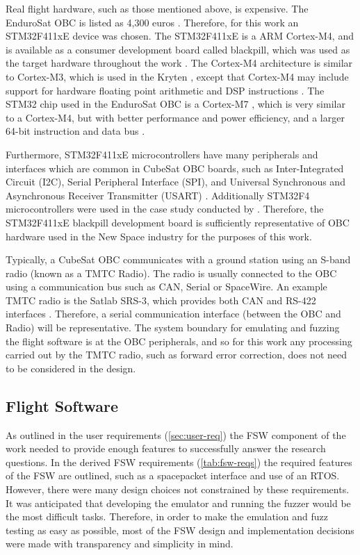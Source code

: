 \documentclass[../report.tex]{subfiles}
\begin{document}
Real flight hardware, such as those mentioned above, is expensive. The
EnduroSat OBC is listed as 4,300 euros \citep{EnduroSat_OBC}. Therefore, for
this work an STM32F411xE device was chosen. The STM32F411xE is a ARM Cortex-M4, and
is available as a consumer development board called blackpill, which was used
as the target hardware throughout the work \citep{blackpill_info}. The
Cortex-M4 architecture is similar to Cortex-M3, which is used in the Kryten
\citep{Clydespace_Kryten}, except that Cortex-M4 may include support for
hardware floating point arithmetic and DSP instructions \citep{Cortex_M3}
\citep{Cortex_M4}. The STM32 chip used in the EnduroSat OBC is a Cortex-M7
\citep{EnduroSat_OBC}, which is very similar to a Cortex-M4, but with better
performance and power efficiency, and a larger 64-bit instruction and data bus
\citep{Cortex_M7}.

Furthermore, STM32F411xE microcontrollers have many peripherals and interfaces
which are common in CubeSat OBC boards, such as Inter-Integrated Circuit (I2C),
Serial Peripheral Interface (SPI), and Universal Synchronous and Asynchronous
Receiver Transmitter (USART) \citep{Cratere_2024}. Additionally STM32F4
microcontrollers were used in the case study conducted by
\citet{Scharnowski_2023}. Therefore, the STM32F411xE blackpill development board
is sufficiently representative of OBC hardware used in the New Space industry
for the purposes of this work.

Typically, a CubeSat OBC communicates with a ground station using an S-band
radio (known as a TMTC Radio). The radio is usually connected to the OBC using
a communication bus such as CAN, Serial or SpaceWire. An example TMTC radio is
the Satlab SRS-3, which provides both CAN and RS-422 interfaces
\citep{Satlab_SRS3}. Therefore, a serial communication interface (between the
OBC and Radio) will be representative. The system boundary for emulating and
fuzzing the flight software is at the OBC peripherals, and so for this work any
processing carried out by the TMTC radio, such as forward error correction, does
not need to be considered in the design.

\subsection{Flight Software} \label{sec:fsw-design}

As outlined in the user requirements (\autoref{sec:user-req}) the FSW component
of the work needed to provide enough features to successfully answer the
research questions. In the derived FSW requirements (\autoref{tab:fsw-reqs})
the required features of the FSW are outlined, such as a spacepacket interface
and use of an RTOS. However, there were many design choices not constrained
by these requirements. It was anticipated that developing the emulator and
running the fuzzer would be the most difficult tasks. Therefore, in order to
make the emulation and fuzz testing as easy as possible, most of the FSW design
and implementation decisions were made with transparency and simplicity in
mind.
\end{document}
